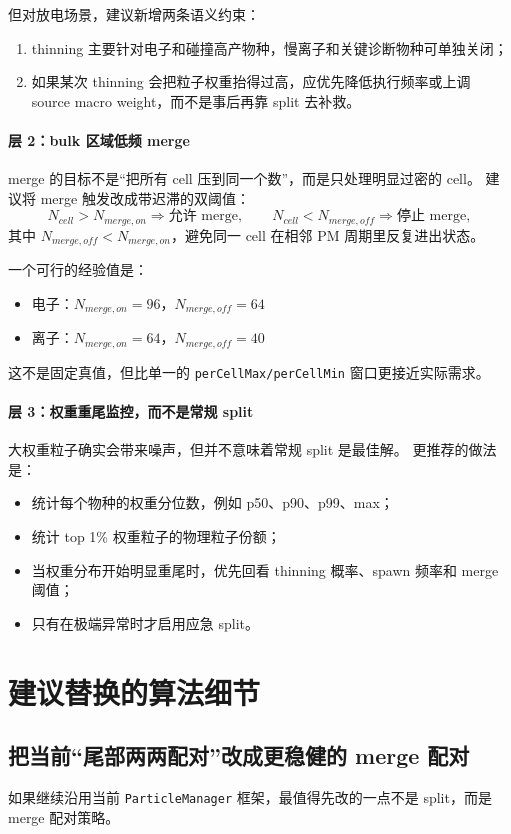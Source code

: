 \documentclass[UTF8,11pt,a4paper]{ctexart}
\begin{document}
但对放电场景，建议新增两条语义约束：
\begin{enumerate}[itemsep=2pt]
  \item thinning 主要针对电子和碰撞高产物种，慢离子和关键诊断物种可单独关闭；
  \item 如果某次 thinning 会把粒子权重抬得过高，应优先降低执行频率或上调 source macro weight，而不是事后再靠 split 去补救。
\end{enumerate}

\paragraph{层 2：bulk 区域低频 merge}
merge 的目标不是“把所有 cell 压到同一个数”，而是只处理明显过密的 cell。
建议将 merge 触发改成带迟滞的双阈值：
\[
N_{cell} > N_{merge,on} \Rightarrow \text{允许 merge}, \qquad
N_{cell} < N_{merge,off} \Rightarrow \text{停止 merge},
\]
其中 $N_{merge,off} < N_{merge,on}$，避免同一 cell 在相邻 PM 周期里反复进出状态。

一个可行的经验值是：
\begin{itemize}[itemsep=2pt]
  \item 电子：$N_{merge,on}=96$，$N_{merge,off}=64$
  \item 离子：$N_{merge,on}=64$，$N_{merge,off}=40$
\end{itemize}
这不是固定真值，但比单一的 \texttt{perCellMax/perCellMin} 窗口更接近实际需求。

\paragraph{层 3：权重重尾监控，而不是常规 split}
大权重粒子确实会带来噪声，但并不意味着常规 split 是最佳解。
更推荐的做法是：
\begin{itemize}[itemsep=2pt]
  \item 统计每个物种的权重分位数，例如 p50、p90、p99、max；
  \item 统计 top 1\% 权重粒子的物理粒子份额；
  \item 当权重分布开始明显重尾时，优先回看 thinning 概率、spawn 频率和 merge 阈值；
  \item 只有在极端异常时才启用应急 split。
\end{itemize}

\section{建议替换的算法细节}

\subsection{把当前“尾部两两配对”改成更稳健的 merge 配对}
如果继续沿用当前 \texttt{ParticleManager} 框架，最值得先改的一点不是 split，而是 merge 配对策略。
\end{document}
